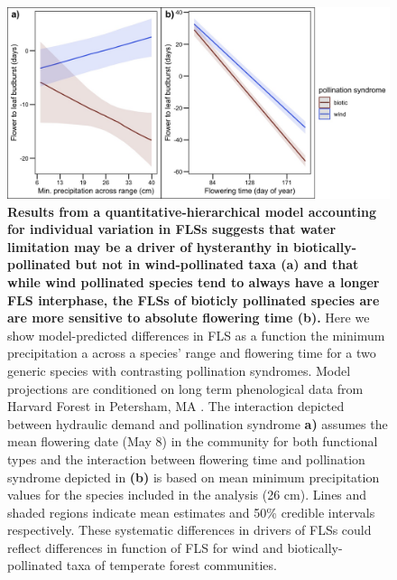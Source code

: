 \documentclass[11pt]{article}
\begin{document}
 \begin{figure}[H] 
       \centering
          \includegraphics[height=0.4\textheight]{..//..//apcs.jpeg}
          \caption{\textbf{Results from a quantitative-hierarchical model accounting for individual variation in FLSs suggests that water limitation may be a driver of hysteranthy in biotically-pollinated but not in wind-pollinated taxa (a)  and that while wind pollinated species tend to always have a longer FLS interphase, the FLSs of bioticly pollinated species are are more sensitive to absolute flowering time (b).} Here we show model-predicted differences in FLS as a function the minimum precipitation a across a species' range and flowering time for a two generic species with contrasting pollination syndromes. Model projections are conditioned on long term phenological data from Harvard Forest in Petersham, MA \citep{OKeefe2015}. The interaction depicted between hydraulic demand and pollination syndrome \textbf{a)} assumes the mean flowering date (May 8) in the community for both functional types and the interaction between flowering time and pollination syndrome depicted in \textbf{(b)} is based on mean minimum precipitation values for the species included in the analysis (26 cm). Lines and shaded regions indicate mean estimates and 50\% credible intervals respectively. These systematic differences in drivers of FLSs could reflect differences in function of FLS for wind and biotically-pollinated taxa of temperate forest communities.}
       \label{fig:apcs}
    \end{figure}
    
\end{document}
